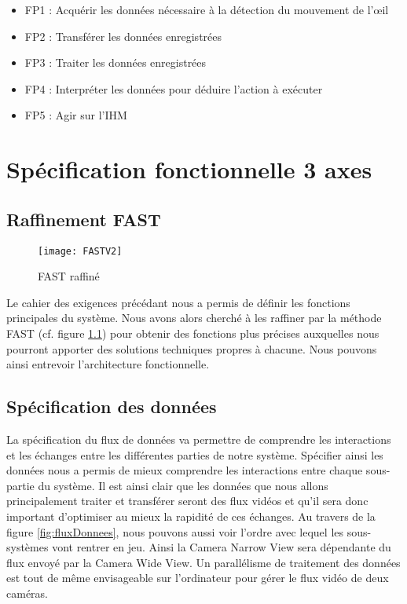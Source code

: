 \begin{itemize}[label=\textbullet,font=\color{black}]
\item FP1 : Acquérir les données nécessaire à la détection du mouvement de l'œil 
\item\colorbox{sable}{FP2 : Transférer les données enregistrées}
\item FP3 : Traiter les données enregistrées 
\item FP4 : Interpréter les données pour déduire l'action à exécuter 
\item FP5 : Agir sur l'IHM 
\end{itemize}

\chapter{Spécification fonctionnelle  3 axes}

\section{Raffinement FAST}

\begin{figure}[h]
  \centering
  \texttt{[image: FASTV2]}
  \caption{FAST raffiné}
  \label{fig:FAST}
\end{figure}

Le cahier des exigences précédant nous a permis de définir les fonctions principales du système. Nous avons alors cherché à les raffiner par la méthode FAST (cf. figure \ref{fig:FAST}) pour obtenir des fonctions plus précises auxquelles nous pourront apporter des solutions techniques propres à chacune. Nous pouvons ainsi entrevoir l'architecture fonctionnelle.

\section{Spécification des données}

La spécification du flux de données va permettre de comprendre les interactions et les échanges entre les différentes parties de notre système. Spécifier ainsi les données nous a permis de mieux comprendre les interactions entre chaque sous-partie du système. Il est ainsi clair que les données que nous allons principalement traiter et transférer seront des flux vidéos et qu’il sera donc important d’optimiser au mieux la rapidité de ces échanges.
Au travers de la figure \ref{fig:fluxDonnees}, nous pouvons aussi voir l’ordre avec lequel les sous-systèmes vont rentrer en jeu. Ainsi la Camera Narrow View sera dépendante du flux envoyé par la Camera Wide View. Un parallélisme de traitement des données est tout de même envisageable sur l'ordinateur pour gérer le flux vidéo de deux caméras.

